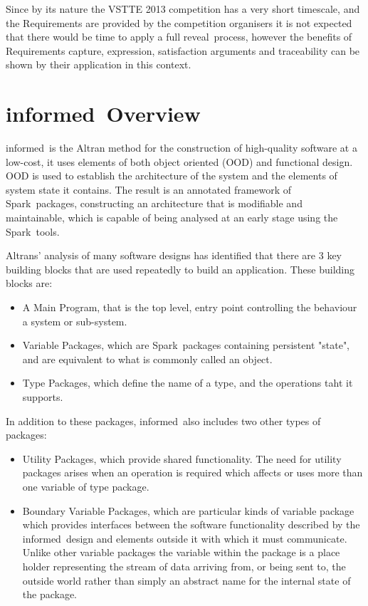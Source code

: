 \documentclass{report}
\newcommand{\spark}[0]{{\sc Spark}}
\newcommand{\reveal}[0]{{\sc reveal}\texttrademark}
\newcommand{\informed}[0]{{\sc informed}}
\begin{document}
\noindent
Since by its nature the VSTTE 2013 competition has a very short
timescale, and the Requirements are provided by the competition
organisers it is not expected that there would be time to apply a full
\reveal\ process, however the benefits of Requirements capture,
expression, satisfaction arguments and traceability can be shown by
their application in this context.

\section{\informed\ Overview}
\label{sec:informed}
\informed\ is the Altran method for the construction of high-quality
software at a low-cost, it uses elements of both object oriented (OOD)
and functional design. OOD is used to establish the architecture of
the system and the elements of system state it contains. The result is
an annotated framework of \spark\ packages, constructing an architecture
that is modifiable and maintainable, which is capable of being
analysed at an early stage using the \spark\ tools.

Altrans' analysis of many software designs has identified that there
are 3 key building blocks that are used repeatedly to build an
application. These building blocks are:

\begin{itemize}
\item A Main Program, that is the top level, entry point controlling
  the behaviour a system or sub-system.
\item Variable Packages, which are \spark\ packages containing
  persistent "state", and are equivalent to what is commonly called an
  object.
\item Type Packages, which define the name of a type, and the
  operations taht it supports.
\end{itemize}

\noindent
In addition to these packages, \informed\ also includes two other
types of packages:

\begin{itemize}
\item Utility Packages, which provide shared functionality. The need
  for utility packages arises when an operation is required which
  affects or uses more than one variable of type package.

\item Boundary Variable Packages, which are particular kinds of
  variable package which provides interfaces between the software
  functionality described by the \informed\ design and elements
  outside it with which it must communicate. Unlike other variable
  packages the variable within the package is a place holder
  representing the stream of data arriving from, or being sent to, the
  outside world rather than simply an abstract name for the internal
  state of the package.
\end{itemize}
\end{document}
